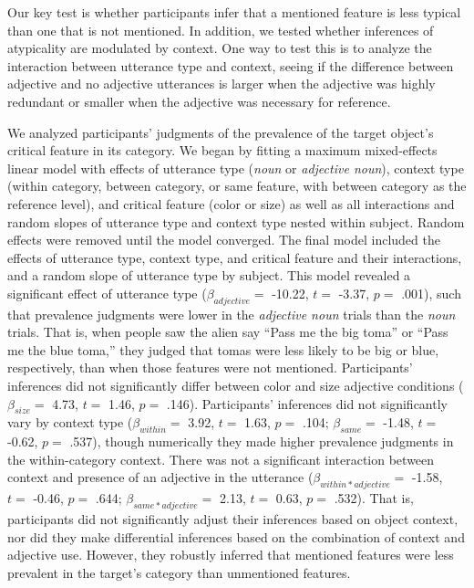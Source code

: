 \documentclass[
  english,
  man,floatsintext]{apa6}
\begin{document}
Our key test is whether participants infer that a mentioned feature is less typical than one that is not mentioned. In addition, we tested whether inferences of atypicality are modulated by context. One way to test this is to analyze the interaction between utterance type and context, seeing if the difference between adjective and no adjective utterances is larger when the adjective was highly redundant or smaller when the adjective was necessary for reference.

We analyzed participants' judgments of the prevalence of the target object's critical feature in its category. We began by fitting a maximum mixed-effects linear model with effects of utterance type (\emph{noun} or \emph{adjective noun}), context type (within category, between category, or same feature, with between category as the reference level), and critical feature (color or size) as well as all interactions and random slopes of utterance type and context type nested within subject. Random effects were removed until the model converged. The final model included the effects of utterance type, context type, and critical feature and their interactions, and a random slope of utterance type by subject. This model revealed a significant effect of utterance type (\(\beta_{adjective} =\) -10.22, \(t =\) -3.37, \(p =\) .001), such that prevalence judgments were lower in the \emph{adjective noun} trials than the \emph{noun} trials. That is, when people saw the alien say ``Pass me the big toma'' or ``Pass me the blue toma,'' they judged that tomas were less likely to be big or blue, respectively, than when those features were not mentioned. Participants' inferences did not significantly differ between color and size adjective conditions (\(\beta_{size} =\) 4.73, \(t =\) 1.46, \(p =\) .146). Participants' inferences did not significantly vary by context type (\(\beta_{within} =\) 3.92, \(t =\) 1.63, \(p =\) .104; \(\beta_{same} =\) -1.48, \(t =\) -0.62, \(p =\) .537), though numerically they made higher prevalence judgments in the within-category context. There was not a significant interaction between context and presence of an adjective in the utterance (\(\beta_{within*adjective} =\) -1.58, \(t =\) -0.46, \(p =\) .644; \(\beta_{same*adjective} =\) 2.13, \(t =\) 0.63, \(p =\) .532). That is, participants did not significantly adjust their inferences based on object context, nor did they make differential inferences based on the combination of context and adjective use. However, they robustly inferred that mentioned features were less prevalent in the target's category than unmentioned features.
\end{document}
